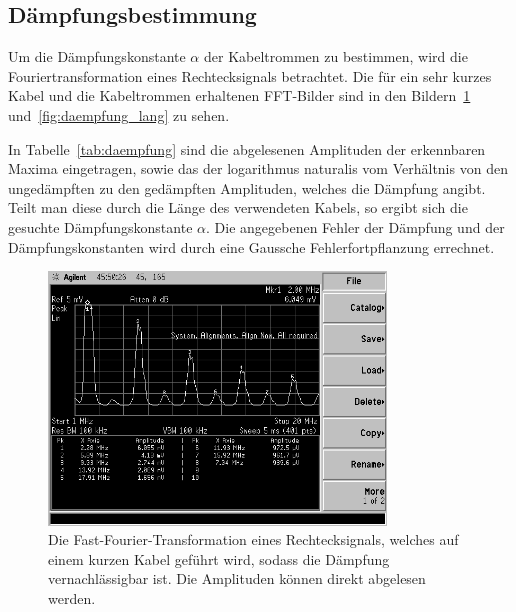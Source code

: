 \subsection{Dämpfungsbestimmung}
%
Um die Dämpfungskonstante $\alpha$ der Kabeltrommen zu bestimmen, wird
die Fouriertransformation eines Rechtecksignals betrachtet. Die für ein
sehr kurzes Kabel und die Kabeltrommen erhaltenen FFT-Bilder sind in den
Bildern~\ref{fig:daempfung_kurz} und~\ref{fig:daempfung_lang} zu sehen.

In Tabelle~\ref{tab:daempfung} sind die abgelesenen Amplituden der
erkennbaren Maxima eingetragen, sowie das der logarithmus naturalis 
vom Verhältnis von den
ungedämpften zu den gedämpften Amplituden, welches die Dämpfung
angibt. Teilt man diese durch die Länge des verwendeten Kabels, so
ergibt sich die gesuchte Dämpfungskonstante $\alpha$.
Die angegebenen Fehler der Dämpfung und der Dämpfungskonstanten 
wird durch eine Gaussche Fehlerfortpflanzung errechnet.
%
\begin{figure}[]
  \centering
  \includegraphics[width=0.8\textwidth]{daempfung_kurz.png}
  \caption{Die Fast-Fourier-Transformation eines Rechtecksignals,
    welches auf einem kurzen Kabel geführt wird, sodass die Dämpfung
    vernachlässigbar ist. Die Amplituden können direkt abgelesen
    werden.}
  \label{fig:daempfung_kurz}
\end{figure}
%
